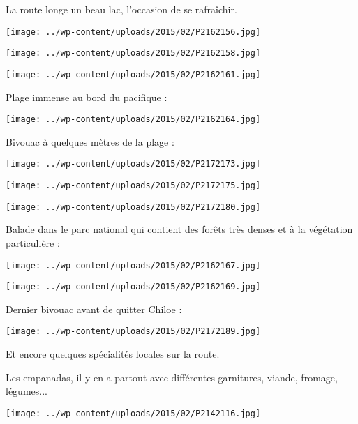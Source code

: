  La route longe un beau lac, l'occasion de se rafraîchir.
\begin{center} \texttt{[image: ../wp-content/uploads/2015/02/P2162156.jpg]} \end{center}
\begin{center} \texttt{[image: ../wp-content/uploads/2015/02/P2162158.jpg]} \end{center}
\begin{center} \texttt{[image: ../wp-content/uploads/2015/02/P2162161.jpg]} \end{center}

\pagebreak
 Plage immense au bord du pacifique :
\begin{center} \texttt{[image: ../wp-content/uploads/2015/02/P2162164.jpg]} \end{center}

 Bivouac à quelques mètres de la plage :
\begin{center} \texttt{[image: ../wp-content/uploads/2015/02/P2172173.jpg]} \end{center}
\begin{center} \texttt{[image: ../wp-content/uploads/2015/02/P2172175.jpg]} \end{center}
\begin{center} \texttt{[image: ../wp-content/uploads/2015/02/P2172180.jpg]} \end{center}

\pagebreak
 Balade dans le parc national qui contient des forêts très denses et à la végétation particulière :
\begin{center} \texttt{[image: ../wp-content/uploads/2015/02/P2162167.jpg]} \end{center}
\begin{center} \texttt{[image: ../wp-content/uploads/2015/02/P2162169.jpg]} \end{center}

\pagebreak
  Dernier bivouac avant de quitter Chiloe :
\begin{center} \texttt{[image: ../wp-content/uploads/2015/02/P2172189.jpg]} \end{center}

 Et encore quelques spécialités locales sur la route.

 Les empanadas, il y en a partout avec différentes garnitures, viande, fromage, légumes...
\begin{center} \texttt{[image: ../wp-content/uploads/2015/02/P2142116.jpg]} \end{center}

